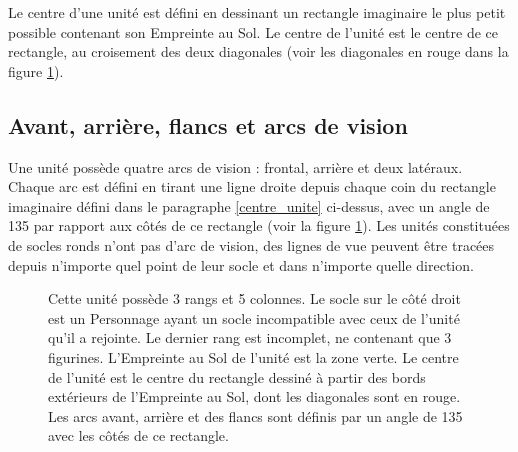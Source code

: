Le centre d'une unité est défini en dessinant un rectangle imaginaire le plus petit possible contenant son Empreinte au Sol. Le centre de l'unité est le centre de ce rectangle, au croisement des deux diagonales (voir les diagonales en rouge dans la figure \ref{figure/arcs}).

\subsection{Avant, arrière, flancs et arcs de vision}

Une unité possède quatre arcs de vision : frontal, arrière et deux latéraux. Chaque arc est défini en tirant une ligne droite depuis chaque coin du rectangle imaginaire défini dans le paragraphe \ref{centre_unite} ci-dessus, avec un angle de 135{\text{\degree}} par rapport aux côtés de ce rectangle (voir la figure \ref{figure/arcs}). Les unités constituées de socles ronds n'ont pas d'arc de vision, des lignes de vue peuvent être tracées depuis n'importe quel point de leur socle et dans n'importe quelle direction.

\newcommand{\frontarc}{Arc frontal}
\newcommand{\leftsidearc}{Arc latéral}
\newcommand{\rightsidearc}{Arc latéral}
\newcommand{\reararc}{Arc arrière}
\newcommand{\centreofunit}{\normalfontsize Centre de l'unité}
\newcommand{\firstangle}{90 \text{\degree}}
\newcommand{\secondangle}{135 \text{\degree}}
\begin{figure}[!htbp]
\begin{minipage}[c]{0.65\textwidth}
\def\svgwidth{\textwidth}

\end{minipage}\hfill
\begin{minipage}[c]{0.32\textwidth}
\caption{Cette unité possède 3 rangs et 5 colonnes. Le socle sur le côté droit est un Personnage ayant un socle incompatible avec ceux de l'unité qu'il a rejointe. Le dernier rang est incomplet, ne contenant que 3 figurines. L'Empreinte au Sol de l'unité est la zone verte. Le centre de l'unité est le centre du rectangle dessiné à partir des bords extérieurs de l'Empreinte au Sol, dont les diagonales sont en rouge. Les arcs avant, arrière et des flancs sont définis par un angle de 135{\text{\degree}} avec les côtés de ce rectangle.}
\label{figure/arcs}
\end{minipage}
\end{figure}
